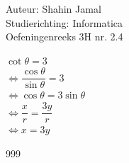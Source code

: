\documentclass[a4paper]{article}
\begin{document}
  
\noindent \large Auteur: Shahin Jamal \\
\noindent \large Studierichting: Informatica\\
\noindent \large Oefeningenreeks 3H nr. 2.4\\

\medskip

\normalsize

$\cot\theta = 3$\\

$\Leftrightarrow \dfrac{\cos\theta}{\sin\theta} = 3$\\

$\Leftrightarrow \cos\theta = 3\sin\theta$\\

$\Leftrightarrow \dfrac{x}{r} = \dfrac{3y}{r}$\\

$\Leftrightarrow x = 3y$\\

\begin{thebibliography}{999}
\end{thebibliography}
\end{document}
